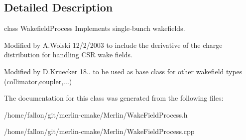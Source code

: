 \subsection{Detailed Description}
class Wakefield\+Process Implements single-\/bunch wakefields.

Modified by A.\+Wolski 12/2/2003 to include the derivative of the charge distribution for handling C\+SR wake fields.

Modified by D.\+Kruecker 18.. to be used as base class for other wakefield types (collimator,coupler,...) 

The documentation for this class was generated from the following files\+:\begin{DoxyCompactItemize}
\item 
/home/fallon/git/merlin-\/cmake/\+Merlin/Wake\+Field\+Process.\+h\item 
/home/fallon/git/merlin-\/cmake/\+Merlin/Wake\+Field\+Process.\+cpp\end{DoxyCompactItemize}
